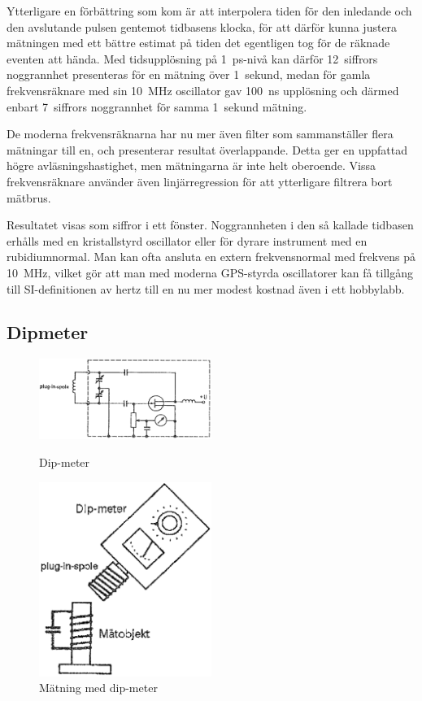 Ytterligare en förbättring som kom är att interpolera tiden för den inledande
och den avslutande pulsen gentemot tidbasens klocka, för att därför kunna
justera mätningen med ett bättre estimat på tiden det egentligen tog för de
räknade eventen att hända.
Med tidsupplösning på 1~ps-nivå kan därför 12~siffrors noggrannhet presenteras
för en mätning över 1~sekund, medan för gamla frekvensräknare med sin 10~MHz
oscillator gav 100~ns upplösning och därmed enbart 7~siffrors noggrannhet för
samma 1~sekund mätning.

De moderna frekvensräknarna har nu mer även filter som sammanställer flera
mätningar till en, och presenterar resultat överlappande.
Detta ger en uppfattad högre avläsningshastighet, men mätningarna är inte helt
oberoende.
Vissa frekvensräknare använder även linjärregression för att ytterligare
filtrera bort mätbrus.

Resultatet visas som siffror i ett fönster.
Noggrannheten i den så kallade tidbasen erhålls med en kristallstyrd oscillator
eller för dyrare instrument med en rubidiumnormal.
Man kan ofta ansluta en extern frekvensnormal med frekvens på 10~MHz,
vilket gör att man med moderna GPS-styrda oscillatorer kan få tillgång till
SI-definitionen av hertz till en nu mer modest kostnad även i ett hobbylabb.

\subsection{Dipmeter}

\begin{figure}
  \includegraphics[width=0.5\textwidth]{images/cropped_pdfs/bild_2_8-12.pdf}
  \caption{Dip-meter}
  \label{fig:bildII8-12}

  \includegraphics[width=0.5\textwidth]{images/cropped_pdfs/bild_2_8-13.pdf}
  \caption{Mätning med dip-meter}
  \label{fig:bildII8-13}
\end{figure}

